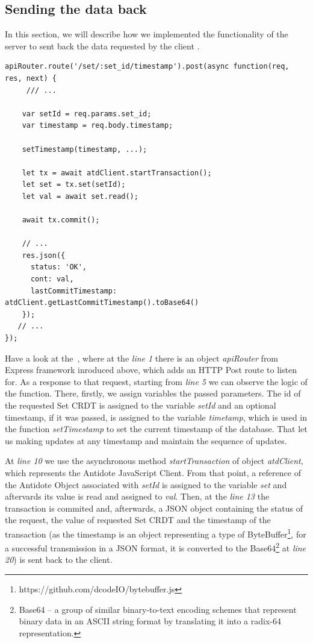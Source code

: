 \subsection*{Sending the data back}

In this section, we will describe how we implemented the functionality of the server to sent back the data requested by the client .

\begin{lstlisting}[caption={Code for sending back to the client the requested data.}, label={lst:dev1}]
apiRouter.route('/set/:set_id/timestamp').post(async function(req, res, next) {   
     /// ...
    
    var setId = req.params.set_id;
    var timestamp = req.body.timestamp;

    setTimestamp(timestamp, ...);

    let tx = await atdClient.startTransaction();
    let set = tx.set(setId);
    let val = await set.read();

    await tx.commit();

    // ...
    res.json({
      status: 'OK',
      cont: val,
      lastCommitTimestamp: atdClient.getLastCommitTimestamp().toBase64()
    });
   // ... 
});
\end{lstlisting} 

Have a look at the~, where at the \textit{line 1} there is an object \textit{apiRouter} from Express framework inroduced above, which adds an HTTP Post route to listen for. As a response to that request, starting from \textit{line 5} we can observe the logic of the function. There, firstly, we assign variables the passed parameters. The id of the requested Set CRDT is assigned to the variable \textit{setId} and an optional timestamp, if it was passed, is assigned to the variable \textit{timetamp}, which is used in the function \textit{setTimestamp} to set the current timestamp of the database. That let us making updates at any timestamp and maintain the sequence of updates.

At \textit{line 10} we use the asynchronous method \textit{startTransaction} of object \textit{atdClient}, which represents the Antidote JavaScript Client. From that point, a reference of the Antidote Object associated with \textit{setId} is assigned to the variable \textit{set} and aftervards its value is read and assigned to \textit{val}. Then, at the \textit{line 13} the transaction is commited and, afterwards, a JSON object containing the status of the request, the value of requested Set CRDT and the timestamp of the transaction (as the timestamp is an object representing a type of ByteBuffer\footnote{https://github.com/dcodeIO/bytebuffer.js}, for a successful transmission in a JSON format, it is converted to the Base64\footnote{Base64 -- a group of similar binary-to-text encoding schemes that represent binary data in an ASCII string format by translating it into a radix-64 representation\cite{53}.} at \textit{line 20}) is sent back to the client.

